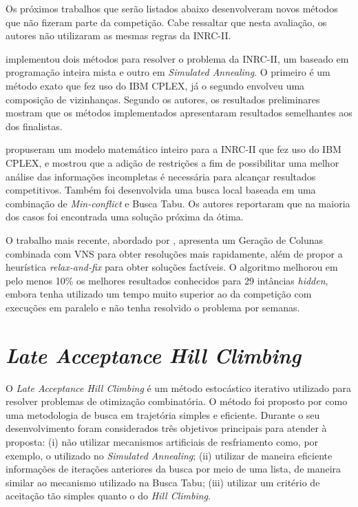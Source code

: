 \documentclass[cic,tc, twoside]{iiufrgs}
\begin{document}
Os próximos trabalhos que serão listados abaixo desenvolveram novos métodos que não fizeram parte da competição. 
Cabe ressaltar que nesta avaliação, os autores não utilizaram as mesmas regras da INRC-II.

\citet{dang2016solving} implementou dois métodos para resolver o problema da \mbox{INRC-II}, um baseado em programação inteira mista e outro em \textit{Simulated Annealing}. O primeiro é um método exato que fez uso do IBM CPLEX, já o segundo envolveu uma composição de vizinhanças. Segundo os autores, os resultados preliminares mostram que os métodos implementados apresentaram resultados semelhantes aos dos finalistas.

\citet{mischek2016integer} propuseram um modelo matemático inteiro para a INRC-II que fez uso do IBM CPLEX, e mostrou que a adição de restrições a fim de possibilitar uma melhor análise das informações incompletas é necessária para alcançar resultados competitivos.
Também foi desenvolvida uma busca local baseada em uma combinação de \textit{Min-conflict} e Busca Tabu. 
Os autores reportaram que na maioria dos casos foi encontrada uma solução próxima da ótima. 


O trabalho mais recente, abordado por \citet{gomes2017variable}, apresenta um Geração de Colunas combinada com VNS para obter resoluções mais rapidamente, além de propor a heurística \textit{relax-and-fix} para obter soluções factíveis. O algoritmo melhorou em pelo menos 10\% os melhores resultados conhecidos para 29 intâncias \textit{hidden}, embora tenha utilizado um tempo muito superior ao da competição com execuções em paralelo e não tenha resolvido o problema por semanas.


\section{\textit{Late Acceptance Hill Climbing}}\label{Seclahc}

O \textit{Late Acceptance Hill Climbing} é um método estocástico iterativo utilizado para resolver problemas de otimização combinatória.
O método foi proposto por \citet{burke2008late} como uma metodologia de busca em trajetória simples e eficiente.
Durante o seu desenvolvimento foram considerados três objetivos principais para atender à proposta:
(i) não utilizar mecanismos artificiais de resfriamento como, por exemplo, o utilizado no \textit{Simulated Annealing}; 
(ii) utilizar de maneira eficiente informações de iterações anteriores da busca por meio de uma lista, de maneira similar ao mecanismo utilizado na Busca Tabu;
(iii) utilizar um critério de aceitação tão simples quanto o do \textit{Hill Climbing}.
\end{document}
